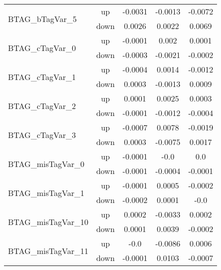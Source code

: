 \begin{table}[h!]
\begin{tabular}{lcccc}
\multirow{2}{*}{BTAG\_bTagVar\_5}      & up   &     -0.0031     &     -0.0013     &     -0.0072      \\
                                       & down &     0.0026     &     0.0022     &     0.0069       \\ \hline
\multirow{2}{*}{BTAG\_cTagVar\_0}      & up   &     -0.0001     &     0.002     &     0.0001      \\
                                       & down &     -0.0003     &     -0.0021     &     -0.0002       \\ \hline
\multirow{2}{*}{BTAG\_cTagVar\_1}      & up   &     -0.0004     &     0.0014     &     -0.0012      \\
                                       & down &     0.0003     &     -0.0013     &     0.0009       \\ \hline
\multirow{2}{*}{BTAG\_cTagVar\_2}      & up   &     0.0001     &     0.0025     &     0.0003      \\
                                       & down &     -0.0001     &     -0.0012     &     -0.0004       \\ \hline
\multirow{2}{*}{BTAG\_cTagVar\_3}      & up   &     -0.0007     &     0.0078     &     -0.0019      \\
                                       & down &     0.0003     &     -0.0075     &     0.0017       \\ \hline
\multirow{2}{*}{BTAG\_misTagVar\_0}      & up   &     -0.0001     &     -0.0     &     0.0      \\
                                       & down &     -0.0001     &     -0.0004     &     -0.0001       \\ \hline
\multirow{2}{*}{BTAG\_misTagVar\_1}      & up   &     -0.0001     &     0.0005     &     -0.0002      \\
                                       & down &     -0.0002     &     0.0001     &     -0.0       \\ \hline
\multirow{2}{*}{BTAG\_misTagVar\_10}      & up   &     0.0002     &     -0.0033     &     0.0002      \\
                                       & down &     0.0001     &     0.0039     &     -0.0002       \\ \hline
\multirow{2}{*}{BTAG\_misTagVar\_11}      & up   &     -0.0     &     -0.0086     &     0.0006      \\
                                       & down &     -0.0001     &     0.0103     &     -0.0007       \\ \hline

\end{tabular}
\end{table}
